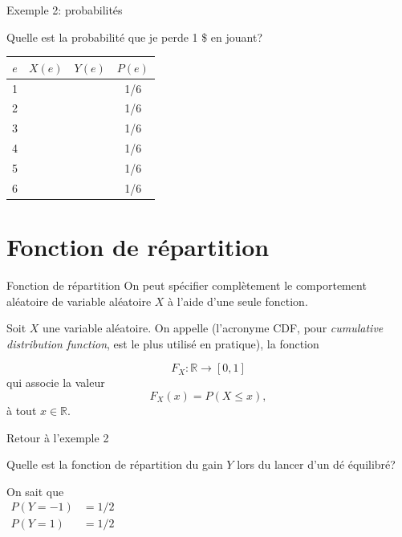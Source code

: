 \documentclass{BeamerTemplate}
\begin{document}
\begin{frame}[t]{Exemple 2: probabilités}

Quelle est la probabilité que je perde 1 \$ en jouant?\\


{\large
 \begin{tabular}{c|c|c|c}\hline
 $e$ & $X(e)$ & $Y(e)$ & $P(e)$ \\ \hline
  1 & & & 1/6 \\
  2 & &  & 1/6  \\
  3 & &  & 1/6  \\
  4 & &  & 1/6  \\
  5 & &  & 1/6  \\
  6 & &  & 1/6  \\ \hline
 \end{tabular}
}


\end{frame}

\section{Fonction de répartition}

\begin{frame}{Fonction de répartition}
On peut spécifier complètement le comportement aléatoire de  variable aléatoire $X$ à l'aide d'une seule fonction.

\begin{defn}{}
Soit $X$ une variable aléatoire. On appelle  (l'acronyme CDF, pour \textit{cumulative distribution function}, est le plus utilisé en pratique), la fonction

$$F_X:\mathbb{R}\to [0,1]$$
qui associe la valeur 
$$F_X(x)=P(X\leq x),$$
à tout $x\in \mathbb{R}$.
\end{defn}
\end{frame}
\begin{frame}[t]{Retour à l'exemple 2}

Quelle est la fonction de répartition du gain $Y$ lors du lancer d'un dé équilibré?%

On sait que\\
$\begin{array}{ll}P(Y=-1)&=1/2\\
P(Y=1)&=1/2\end{array}$

\end{frame}
\end{document}

